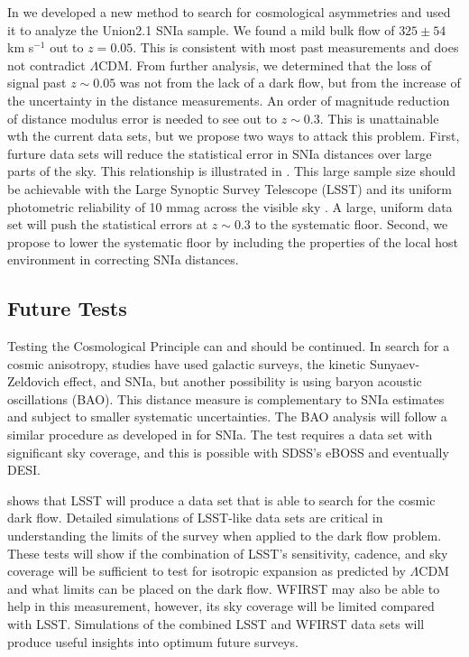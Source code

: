 \documentclass[apj, iop]{emulateapj}
\newcommand{\sn}{SNIa}
\begin{document}
In \cite{Mathews16} we developed a new method to search for cosmological asymmetries
and used it to analyze the Union2.1 \citep{Suzuki12} \sn{} sample. We found a mild
bulk flow of $325 \pm 54$ km s$^{-1}$ out to $z = 0.05$. This is consistent with
most past measurements and does not contradict $\Lambda$CDM. From further
analysis, we determined that the loss of signal past $z \sim 0.05$ was not
from the lack of a dark flow, but from the increase of the
uncertainty in the distance measurements. An order of magnitude reduction of
distance modulus error is needed to see out to $z \sim 0.3$. This is unattainable wth
the current data sets, but we propose two ways to attack this problem. First, furture
data sets will reduce the statistical error in \sn{} distances over large parts of the sky.
This relationship is
illustrated  in . This large sample size should be achievable
with the Large Synoptic Survey Telescope (LSST) and its uniform
photometric reliability of 10 mmag across the visible sky
\citep{Ivezic08}. A large, uniform data set will push the statistical errors at $z\sim 0.3$ to
the systematic floor. Second, we propose to lower the systematic floor by including the
properties of the local host environment in correcting \sn{} distances.

\subsection{Future Tests}\label{future-tests}

Testing the Cosmological Principle can and should be continued. In search for a
cosmic anisotropy, studies have used galactic surveys, the kinetic Sunyaev-
Zel\'dovich effect, and SNIa, but another possibility is using baryon acoustic
oscillations (BAO). This distance measure is complementary to \sn{} estimates
and subject to smaller systematic uncertainties.
The BAO analysis will follow a similar procedure as developed in
\cite{Mathews16} for SNIa. The test requires a
data set with significant sky coverage, and this is possible with SDSS's eBOSS
and eventually DESI.


\cite{Mathews16} shows that LSST will produce a data set that is able to search for
the cosmic dark flow. Detailed simulations of LSST-like data sets are critical in understanding
the limits of the survey when applied to the dark flow problem. These tests will show if the combination of
LSST's sensitivity, cadence, and sky coverage will be sufficient to test
for isotropic expansion as predicted by $\Lambda$CDM and what limits can be
placed on the dark flow.
WFIRST may also be able to help in this measurement, however, its sky
coverage will be limited compared with LSST.
Simulations of the combined LSST and WFIRST data sets will produce useful insights into
optimum future surveys.
\end{document}
